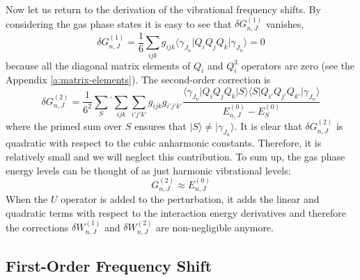 \documentclass[a4paper,titlepage,twoside,fleqn,12pt]{book}
\begin{document}
\begin{refsection}
Now let us return to the derivation of the vibrational frequency shifts. 
By considering the gas phase states it is easy to see that 
$\delta G_{n,J}^{(1)}$ vanishes,
%
\begin{equation}
\delta G_{n,J}^{(1)} = \frac{1}{6}\sum_{ijk} g_{ijk} 
\langle \gamma_{J_n} \vert Q_iQ_jQ_k \vert \gamma_{J_n} \rangle = 0
\end{equation}
%
because all the diagonal matrix elements of $Q_i$ and $Q_i^3$ operators
are zero (see the Appendix \ref{a:matrix-elements}).  %
The second\hyp{}order correction is 
%
\begin{equation}
\delta G_{n,J}^{(2)} = \frac{1}{6^2} \sum_{S}{^{'}} \sum_{ijk}\sum_{i'j'k'} g_{ijk} g_{i'j'k'}
\frac{\langle \gamma_{J_n} \vert Q_iQ_jQ_k \vert S \rangle \langle S \vert Q_{i'}Q_{j'}Q_{k'} \vert \gamma_{J_n} \rangle }
{ E_{n,J}^{(0)} - E_{S}^{(0)} }
\end{equation}
%
where the primed sum over $S$ ensures that $\vert S \rangle \ne \vert \gamma_{J_n} \rangle$. 
It is clear that $\delta G_{n,J}^{(2)}$ is quadratic with respect to the cubic anharmonic constants.
Therefore, it is relatively small and we will neglect this contribution.
To sum up, the gas phase energy levels can be thought of as just 
harmonic vibrational levels:
%
\begin{equation}\label{e:ge}
G_{n,J}^{(2)} \approx E_{n,J}^{(0)}
\end{equation}
%
When the $U$ operator is added to the perturbation, it adds the linear
and quadratic terms with respect to the interaction energy derivatives and therefore
the corrections $\delta W_{n,J}^{(1)}$ and $\delta W_{n,J}^{(2)}$ 
are non\hyp{}negligible anymore.

\subsection{First-Order Frequency Shift}


\end{refsection}
\end{document}
